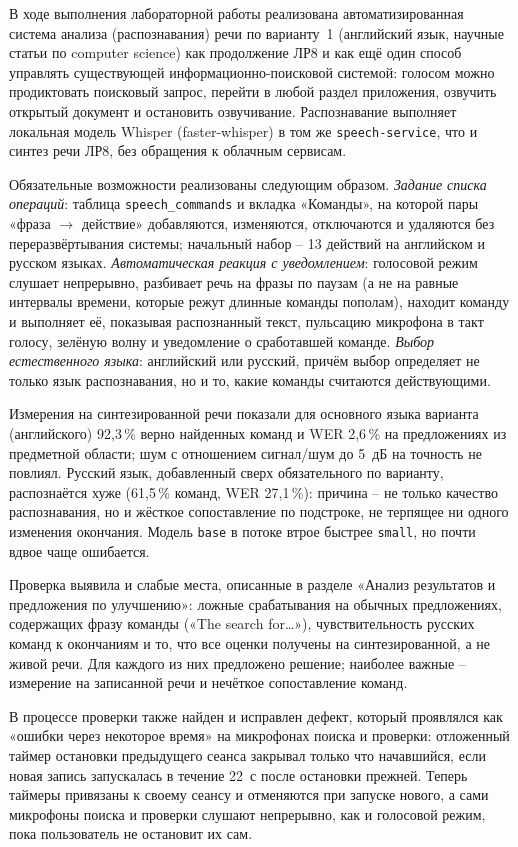 

В ходе выполнения лабораторной работы реализована автоматизированная
система анализа (распознавания) речи по варианту~1 (английский язык,
научные статьи по computer science) как продолжение ЛР8 и как ещё один
способ управлять существующей информационно-поисковой системой:
голосом можно продиктовать поисковый запрос, перейти в любой раздел
приложения, озвучить открытый документ и остановить озвучивание.
Распознавание выполняет локальная модель Whisper (faster-whisper) в том
же \texttt{speech-service}, что и синтез речи ЛР8, без обращения к
облачным сервисам.

Обязательные возможности реализованы следующим образом.
\emph{Задание списка операций}: таблица \texttt{speech\_commands} и
вкладка «Команды», на которой пары «фраза $\to$ действие» добавляются,
изменяются, отключаются и удаляются без переразвёртывания системы;
начальный набор -- 13 действий на английском и русском языках.
\emph{Автоматическая реакция с уведомлением}: голосовой режим
слушает непрерывно, разбивает речь на фразы по паузам (а не на равные
интервалы времени, которые режут длинные команды пополам), находит
команду и выполняет её, показывая распознанный текст, пульсацию
микрофона в такт голосу, зелёную волну и уведомление о сработавшей
команде. \emph{Выбор естественного языка}: английский или русский,
причём выбор определяет не только язык распознавания, но и то, какие
команды считаются действующими.

Измерения на синтезированной речи показали для основного языка
варианта (английского) 92{,}3\,\% верно найденных команд и WER 2{,}6\,\%
на предложениях из предметной области; шум с отношением сигнал/шум до
5~дБ на точность не повлиял. Русский язык, добавленный сверх
обязательного по варианту, распознаётся хуже (61{,}5\,\% команд, WER
27{,}1\,\%): причина -- не только качество распознавания, но и жёсткое
сопоставление по подстроке, не терпящее ни одного изменения окончания.
Модель \texttt{base} в потоке втрое быстрее \texttt{small}, но
почти вдвое чаще ошибается.

Проверка выявила и слабые места, описанные в разделе «Анализ
результатов и предложения по улучшению»: ложные срабатывания на
обычных предложениях, содержащих фразу команды («The search for\ldots»),
чувствительность русских команд к окончаниям и то, что все оценки
получены на синтезированной, а не живой речи. Для каждого из них
предложено решение; наиболее важные -- измерение на записанной речи и
нечёткое сопоставление команд.

В процессе проверки также найден и исправлен дефект, который
проявлялся как «ошибки через некоторое время» на микрофонах поиска и
проверки: отложенный таймер остановки предыдущего сеанса закрывал
только что начавшийся, если новая запись запускалась в течение 22~с
после остановки прежней. Теперь таймеры привязаны к своему сеансу и
отменяются при запуске нового, а сами микрофоны поиска и проверки
слушают непрерывно, как и голосовой режим, пока пользователь не
остановит их сам.
